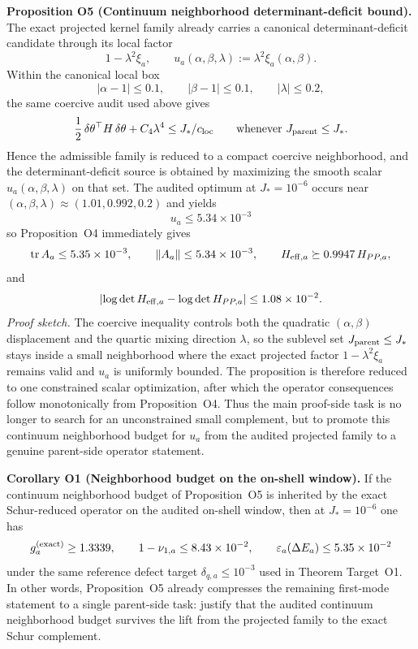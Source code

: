 \documentclass[aps,prd,onecolumn,notitlepage,nofootinbib,superscriptaddress,11pt,floatfix]{revtex4-2}
\begin{document}
\medskip\noindent\textbf{Proposition O5 (Continuum neighborhood determinant-deficit bound).}
The exact projected kernel family already carries a canonical determinant-deficit candidate through its local factor
\[
1-\lambda^2\xi_a,
\qquad
u_a(\alpha,\beta,\lambda):=\lambda^2\xi_a(\alpha,\beta).
\]
Within the canonical local box
\[
|\alpha-1|\le 0.1,
\qquad
|\beta-1|\le 0.1,
\qquad
|\lambda|\le 0.2,
\]
the same coercive audit used above gives
\[
\frac12\,\delta\theta^\top H\,\delta\theta + C_4\lambda^4 \le J_\ast/c_{\rm loc}
\qquad
\text{whenever }J_{\rm parent}\le J_\ast.
\]
Hence the admissible family is reduced to a compact coercive neighborhood, and the determinant-deficit source is obtained by maximizing the smooth scalar $u_a(\alpha,\beta,\lambda)$ on that set. The audited optimum at $J_\ast=10^{-6}$ occurs near $(\alpha,\beta,\lambda)\approx(1.01,0.992,0.2)$ and yields
\[
u_a\le 5.34\times10^{-3}
\]
so Proposition~O4 immediately gives
\[
\mathrm{tr}\,A_a\le 5.35\times10^{-3},
\qquad
\|A_a\|\le 5.34\times10^{-3},
\qquad
H_{{\rm eff},a}\succeq 0.9947\,H_{PP,a},
\]
and
\[
\left|\log\det H_{{\rm eff},a}-\log\det H_{PP,a}\right|
\le 1.08\times10^{-2}.
\]
\textit{Proof sketch.} The coercive inequality controls both the quadratic $(\alpha,\beta)$ displacement and the quartic mixing direction $\lambda$, so the sublevel set $J_{\rm parent}\le J_\ast$ stays inside a small neighborhood where the exact projected factor $1-\lambda^2\xi_a$ remains valid and $u_a$ is uniformly bounded. The proposition is therefore reduced to one constrained scalar optimization, after which the operator consequences follow monotonically from Proposition~O4. Thus the main proof-side task is no longer to search for an unconstrained small complement, but to promote this continuum neighborhood budget for $u_a$ from the audited projected family to a genuine parent-side operator statement.

\medskip\noindent\textbf{Corollary O1 (Neighborhood budget on the on-shell window).}
If the continuum neighborhood budget of Proposition~O5 is inherited by the exact Schur-reduced operator on the audited on-shell window, then at $J_\ast=10^{-6}$ one has
\[
g_a^{\rm(exact)}\ge 1.3339,
\qquad
1-\nu_{1,a}\le 8.43\times10^{-2},
\qquad
\varepsilon_a(\Delta E_a)\le 5.35\times10^{-2}
\]
under the same reference defect target $\delta_{q,a}\le 10^{-3}$ used in Theorem Target~O1. In other words, Proposition~O5 already compresses the remaining first-mode statement to a single parent-side task: justify that the audited continuum neighborhood budget survives the lift from the projected family to the exact Schur complement.
\end{document}
